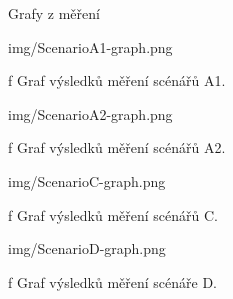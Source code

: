
\def\ctustyle{{\ssr CTUstyle}}
\def\ttb{\tt\char`\\} %

\app Grafy z měření

\medskip
{}
\picw=16cm \cinspic img/ScenarioA1-graph.png
\caption/f Graf výsledků měření scénářů A1.
\medskip

\medskip
{}
\picw=16cm \cinspic img/ScenarioA2-graph.png
\caption/f Graf výsledků měření scénářů A2.
\medskip

\medskip
{}
\picw=16cm \cinspic img/ScenarioC-graph.png
\caption/f Graf výsledků měření scénářů C.
\medskip

\medskip
{}
\picw=16cm \cinspic img/ScenarioD-graph.png
\caption/f Graf výsledků měření scénáře D.
\medskip